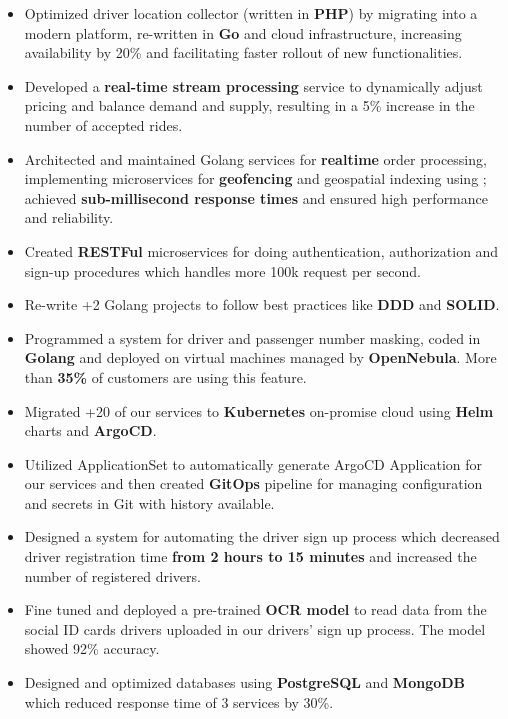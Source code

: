 \vspace{0.5cm}

\begin{itemize}
      \item Optimized driver location collector (written in \textbf{PHP}) by migrating into a modern platform, re-written in \textbf{Go} and cloud infrastructure,
            increasing availability by 20\% and facilitating faster rollout of new functionalities.
      \item Developed a \textbf{real-time stream processing} service to dynamically adjust pricing and balance demand and supply,
            resulting in a 5\% increase in the number of accepted rides.
      \item Architected and maintained Golang services for \textbf{realtime} order processing, implementing microservices for \textbf{geofencing} and geospatial indexing using ; achieved \textbf{sub-millisecond response times} and ensured high performance and reliability.
      \item Created \textbf{RESTFul} microservices for doing authentication, authorization and sign-up procedures which handles more 100k request per second.
      \item Re-write +2 Golang projects to follow best practices like \textbf{DDD} and \textbf{SOLID}.
      \item Programmed a system for driver and passenger number masking, coded in \textbf{Golang}
            and deployed on virtual machines managed by \textbf{OpenNebula}. More than \textbf{35\%} of customers are using this feature.
      \item Migrated +20 of our services to \textbf{Kubernetes} on-promise cloud using \textbf{Helm} charts and \textbf{ArgoCD}.
      \item Utilized  ApplicationSet to automatically generate ArgoCD Application
            for our services and then created \textbf{GitOps} pipeline for managing configuration
            and secrets in Git with history available.
      \item Designed a system for automating the driver sign up process which decreased driver registration time \textbf{from 2 hours to 15 minutes} and increased the number of registered drivers.
      \item Fine tuned and deployed a pre-trained \textbf{OCR model} to read data from the social ID cards drivers uploaded in our drivers' sign up process. The model showed 92\% accuracy.
      \item Designed and optimized databases using \textbf{PostgreSQL} and \textbf{MongoDB} which reduced response time of 3 services by 30\%.
\end{itemize}

